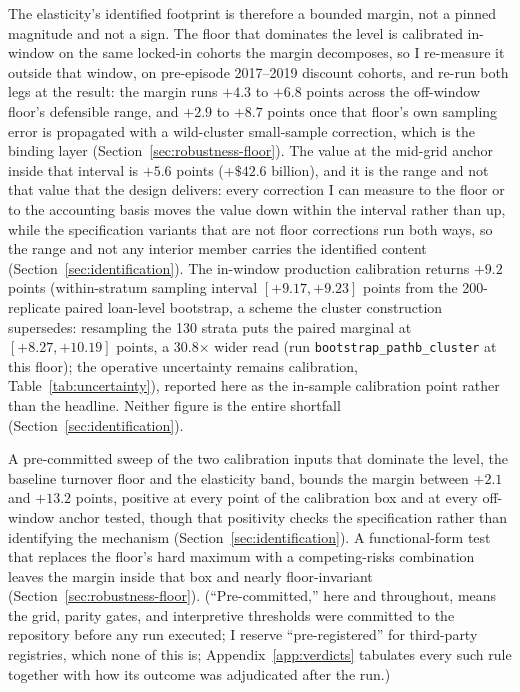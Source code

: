 \documentclass[12pt]{article}
\begin{document}
The elasticity's identified footprint is therefore a bounded margin, not a pinned magnitude and not a sign. The floor that dominates the level is calibrated in-window on the same locked-in cohorts the margin decomposes, so I re-measure it outside that window, on pre-episode 2017--2019 discount cohorts, and re-run both legs at the result: the margin runs $+4.3$ to $+6.8$ points across the off-window floor's defensible range, and $+2.9$ to $+8.7$ points once that floor's own sampling error is propagated with a wild-cluster small-sample correction, which is the binding layer (Section~\ref{sec:robustness-floor}). The value at the mid-grid anchor inside that interval is $+5.6$ points ($+\$42.6$ billion), and it is the range and not that value that the design delivers: every correction I can measure to the floor or to the accounting basis moves the value down within the interval rather than up, while the specification variants that are not floor corrections run both ways, so the range and not any interior member carries the identified content (Section~\ref{sec:identification}). The in-window production calibration returns $+9.2$ points (within-stratum sampling interval $[+9.17, +9.23]$ points from the 200-replicate paired loan-level bootstrap, a scheme the cluster construction supersedes: resampling the 130 strata puts the paired marginal at $[+8.27, +10.19]$ points, a 30.8$\times$ wider read (run \texttt{bootstrap\_pathb\_cluster} at this floor); the operative uncertainty remains calibration, Table~\ref{tab:uncertainty}), reported here as the in-sample calibration point rather than the headline. Neither figure is the entire shortfall (Section~\ref{sec:identification}).

A pre-committed sweep of the two calibration inputs that dominate the level, the baseline turnover floor and the elasticity band, bounds the margin between $+2.1$ and $+13.2$ points, positive at every point of the calibration box and at every off-window anchor tested, though that positivity checks the specification rather than identifying the mechanism (Section~\ref{sec:identification}). A functional-form test that replaces the floor's hard maximum with a competing-risks combination leaves the margin inside that box and nearly floor-invariant (Section~\ref{sec:robustness-floor}). (``Pre-committed,'' here and throughout, means the grid, parity gates, and interpretive thresholds were committed to the repository before any run executed; I reserve ``pre-registered'' for third-party registries, which none of this is; Appendix~\ref{app:verdicts} tabulates every such rule together with how its outcome was adjudicated after the run.)
\end{document}
